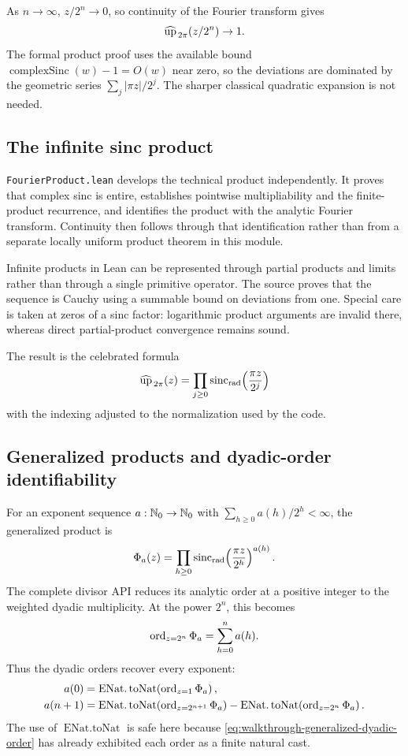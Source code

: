 \documentclass[11pt,oneside]{article}
\theoremstyle{definition}
\theoremstyle{remark}
\begin{document}
As \(n\to\infty\), \(z/2^n\to0\), so continuity of the Fourier transform gives
\[
  \widehat{\operatorname{up}}_{\,2\pi}(z/2^n)\to1.
\]
The formal product proof uses the available bound \(\operatorname{complexSinc}(w)-1=O(w)\) near zero, so the deviations are dominated by the geometric series \(\sum_j |\pi z|/2^j\).  The sharper classical quadratic expansion is not needed.

\subsection{The infinite sinc product}
\nolinkurl{FourierProduct.lean} develops the technical product independently.  It proves that complex sinc is entire, establishes pointwise multipliability and the finite-product recurrence, and identifies the product with the analytic Fourier transform.  Continuity then follows through that identification rather than from a separate locally uniform product theorem in this module.

Infinite products in Lean can be represented through partial products and limits rather than through a single primitive operator.  The source proves that the sequence is Cauchy using a summable bound on deviations from one.  Special care is taken at zeros of a sinc factor: logarithmic product arguments are invalid there, whereas direct partial-product convergence remains sound.

The result is the celebrated formula
\[
  \widehat{\operatorname{up}}_{\,2\pi}(z)
   =\prod_{j\geq0}
      \operatorname{sinc}_{\mathrm{rad}}\!\left(\frac{\pi z}{2^j}\right)
\]
with the indexing adjusted to the normalization used by the code.

\subsection{Generalized products and dyadic-order identifiability}
For an exponent sequence \(a:\mathbb{N}_{0}\to\mathbb{N}_{0}\) with
\(\sum_{h\ge0}a(h)/2^h<\infty\), the generalized product is
\[
 \Phi_a(z)=\prod_{h\ge0}
   \operatorname{sinc}_{\mathrm{rad}}\!\left(\frac{\pi z}{2^h}\right)^{a(h)}.
\]
The complete divisor API reduces its analytic order at a positive integer to
the weighted dyadic multiplicity.  At the power \(2^n\), this becomes
\begin{equation}
 \operatorname{ord}_{z=2^n}\Phi_a
   =\sum_{h=0}^{n}a(h).                                  \label{eq:walkthrough-generalized-dyadic-order}
\end{equation}
Thus the dyadic orders recover every exponent:
\begin{align}
 a(0)&=\operatorname{ENat.toNat}\!\left(
   \operatorname{ord}_{z=1}\Phi_a\right),\label{eq:walkthrough-generalized-head}\\
 a(n+1)&=\operatorname{ENat.toNat}\!\left(
   \operatorname{ord}_{z=2^{n+1}}\Phi_a\right)
 -\operatorname{ENat.toNat}\!\left(
   \operatorname{ord}_{z=2^n}\Phi_a\right).\label{eq:walkthrough-generalized-difference}
\end{align}
The use of \(\operatorname{ENat.toNat}\) is safe here because
\eqref{eq:walkthrough-generalized-dyadic-order} has already exhibited each
order as a finite natural cast.
\end{document}
